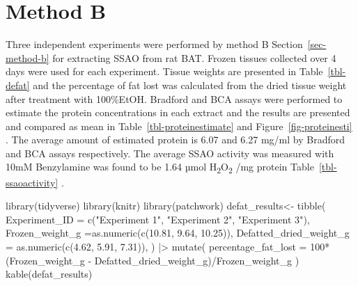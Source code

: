 \documentclass[
  letterpaper,
  DIV=11,
  numbers=noendperiod]{scrreprt}
\newenvironment{Shaded}{\begin{snugshade}}{\end{snugshade}}
\newcommand{\AttributeTok}[1]{\textcolor[rgb]{0.40,0.45,0.13}{#1}}
\newcommand{\DecValTok}[1]{\textcolor[rgb]{0.68,0.00,0.00}{#1}}
\newcommand{\FloatTok}[1]{\textcolor[rgb]{0.68,0.00,0.00}{#1}}
\newcommand{\FunctionTok}[1]{\textcolor[rgb]{0.28,0.35,0.67}{#1}}
\newcommand{\NormalTok}[1]{\textcolor[rgb]{0.00,0.23,0.31}{#1}}
\newcommand{\OtherTok}[1]{\textcolor[rgb]{0.00,0.23,0.31}{#1}}
\newcommand{\SpecialCharTok}[1]{\textcolor[rgb]{0.37,0.37,0.37}{#1}}
\newcommand{\StringTok}[1]{\textcolor[rgb]{0.13,0.47,0.30}{#1}}
\begin{document}
\section{Method B}\label{method-b}

Three independent experiments were performed by method B
Section~\ref{sec-method-b} for extracting SSAO from rat BAT. Frozen
tissues collected over 4 days were used for each experiment. Tissue
weights are presented in Table~\ref{tbl-defat} and the percentage of fat
lost was calculated from the dried tissue weight after treatment with
100\%EtOH. Bradford and BCA assays were performed to estimate the
protein concentrations in each extract and the results are presented and
compared as mean in Table~\ref{tbl-proteinestimate} and
Figure~\ref{fig-proteinesti} . The average amount of estimated protein
is 6.07 and 6.27 mg/ml by Bradford and BCA assays respectively. The
average SSAO activity was measured with 10mM Benzylamine was found to be
1.64 µmol H\textsubscript{2}O\textsubscript{2} /mg protein
Table~\ref{tbl-ssaoactivity} .

\begin{Shaded}
\begin{Highlighting}[]
\FunctionTok{library}\NormalTok{(tidyverse)}
\FunctionTok{library}\NormalTok{(knitr)}
\FunctionTok{library}\NormalTok{(patchwork)}
\NormalTok{defat\_results}\OtherTok{\textless{}{-}} \FunctionTok{tibble}\NormalTok{(}
  \AttributeTok{Experiment\_ID =} \FunctionTok{c}\NormalTok{(}\StringTok{"Experiment 1"}\NormalTok{, }\StringTok{"Experiment 2"}\NormalTok{, }\StringTok{"Experiment 3"}\NormalTok{),}
  \AttributeTok{Frozen\_weight\_g =}\FunctionTok{as.numeric}\NormalTok{(}\FunctionTok{c}\NormalTok{(}\FloatTok{10.81}\NormalTok{, }\FloatTok{9.64}\NormalTok{, }\FloatTok{10.25}\NormalTok{)),}
  \AttributeTok{Defatted\_dried\_weight\_g =} \FunctionTok{as.numeric}\NormalTok{(}\FunctionTok{c}\NormalTok{(}\FloatTok{4.62}\NormalTok{, }\FloatTok{5.91}\NormalTok{, }\FloatTok{7.31}\NormalTok{)),}
\NormalTok{) }\SpecialCharTok{|\textgreater{}} 
  \FunctionTok{mutate}\NormalTok{(}
    \AttributeTok{percentage\_fat\_lost =} \DecValTok{100}\SpecialCharTok{*}\NormalTok{(Frozen\_weight\_g }\SpecialCharTok{{-}}\NormalTok{ Defatted\_dried\_weight\_g)}\SpecialCharTok{/}\NormalTok{Frozen\_weight\_g}
\NormalTok{    )}
\FunctionTok{kable}\NormalTok{(defat\_results)}
\end{Highlighting}
\end{Shaded}
\end{document}
